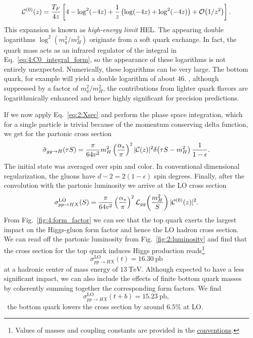 \begin{equation}
\mathcal{C}^{(0)}(z) = \frac{T_F}{4z} \left[ 4 - \log^2\!\left(-4 z \right) + \frac{1}{z} \left( \log\!\left(-4 z \right) + \log^2\!\left(-4 z \right) \right) + \mathcal{O}\!\left(1/z^2\right) \right].
\label{eq:4:C0_HEL}
\end{equation}
This expansion is known as \textit{high-energy limit} \acs{HEL}. The appearing double logarithms $\log^2 (m_q^2/m_H^2)$ originate from a soft quark exchange. In fact, the quark mass acts as an infrared regulator of the integral in Eq.~\ref{eq:4:C0_integral_form}, so the appearance of these logarithms is not entirely unexpected. Numerically, these logarithms can be very large. The bottom quark, for example will yield a double logarithm of about $46$. \Ie, although suppressed by a factor of $m_q^2/m_H^2$, the contributions from lighter quark flavors are logarithmically enhanced and hence highly significant for precision predictions.

If we now apply Eq.~\eqref{eq:2:Xsec} and perform the phase space integration, which for a single particle is trivial because of the momentum conserving delta function, we get for the partonic cross section
\begin{equation}
\hat{\sigma}_{gg \rightarrow H}(\tau S) = \frac{\pi}{64 v^2} m_H^2 \left( \frac{\alpha_s}{\pi} \right)^2 |\mathcal{C}(z)|^2 \delta\! \left(\tau S - m_H^2 \right) \frac{1}{1 - \epsilon}.
\label{eq:4:ggH_cross_section}
\end{equation}
The initial state was averaged over spin and color. In conventional dimensional regularization, the gluons have $d - 2 = 2 (1 - \epsilon)$ spin degrees. Finally, after the convolution with the partonic luminosity we arrive at the LO cross section
\begin{equation}
\sigma_{pp \rightarrow HX}^{\text{LO}}(S) = \frac{\pi}{64v^2} \left(\frac{\alpha_s}{\pi} \right)^2 \mathcal{L}_{gg}\!\left(\frac{m_H^2}{S} \right) |\mathcal{C}^{(0)}(z)|^2.
\end{equation}
From Fig.~\ref{fig:4:form_factor} we can see that the top quark exerts the largest impact on the Higgs-gluon form factor and hence the \acs{LO} hadron cross section. We can read off the partonic luminosity from Fig.~\ref{fig:2:luminosity} and find that the cross section for the top quark induces Higgs production reads\footnote{Values of masses and coupling constants are provided in the \hyperref[chap:notation_and_conventions]{conventions}.}
\begin{equation}
\sigma_{pp \rightarrow HX}^{\text{LO}} (t) = 16.30\ \mathrm{pb}
\end{equation}
at a hadronic center of mass energy of $13\ \text{TeV}$. Although expected to have a less significant impact, we can also include the effects of finite bottom quark masses by coherently summing together the corresponding form factors. We find
\begin{equation}
\sigma_{pp \rightarrow HX}^{\text{LO}}(t+b) = 15.23\ \mathrm{pb},
\end{equation}
\ie\ the bottom quark lowers the cross section by around $6.5\%$ at \acs{LO}.

